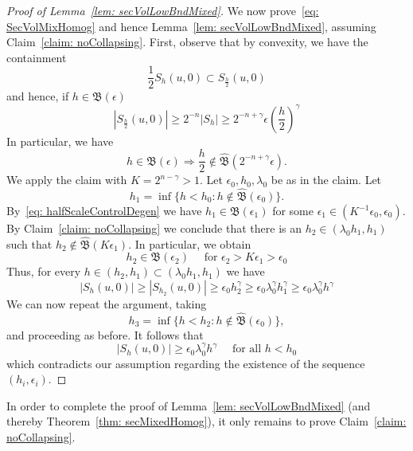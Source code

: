 \documentclass[12pt,reqno]{amsart}
\numberwithin{equation}{section}
\begin{document}
\begin{proof}[Proof of Lemma~\ref{lem: secVolLowBndMixed}]
We now prove~\eqref{eq: SecVolMixHomog} and hence Lemma~\ref{lem: secVolLowBndMixed}, assuming Claim~\ref{claim: noCollapsing}.  First, observe that by convexity, we have the containment
\[
\frac{1}{2}S_{h}(u,0) \subset S_{\frac{h}{2}}(u,0)
\]
and hence, if $h \in \mathfrak{B}(\epsilon)$
\[
|S_{\frac{h}{2}}(u,0)| \geq 2^{-n}|S_{h}| \geq 2^{-n+\gamma} \epsilon \left(\frac{h}{2}\right)^{\gamma}
\]
In particular, we have
\begin{equation}\label{eq: halfScaleControlDegen}
h \in \mathfrak{B}(\epsilon) \Rightarrow \frac{h}{2} \notin \widehat{\mathfrak{B}}(2^{-n+\gamma} \epsilon).
\end{equation}
We apply the claim with $K = 2^{n-\gamma}>1$.  Let $\epsilon_0, h_0, \lambda_0$ be as in the claim.  Let 
\[
h_1 = \inf \{ h< h_0 : h \notin \widehat{\mathfrak{B}} (\epsilon_0)\}.
\]
By~\eqref{eq: halfScaleControlDegen} we have $h_1 \in \mathfrak{B}(\epsilon_1)$ for some $\epsilon_1 \in (K^{-1} \epsilon_0, \epsilon_0)$.  By Claim~\ref{claim: noCollapsing} we conclude that there is an $h_2\in (\lambda_0h_1,h_1)$ such that $h_2 \notin \widehat{\mathfrak{B}}(K\epsilon_1)$.  In particular, we obtain
\[
h_2 \in \mathfrak{B}(\epsilon_2) \quad \text{ for } \epsilon_2 >K\epsilon_1 > \epsilon_0
\]
Thus, for every $h\in(h_2,h_1) \subset (\lambda_0h_1,h_1)$ we have
\[
|S_{h}(u,0)| \geq |S_{h_2}(u,0)| \geq \epsilon_0h_2^{\gamma} \geq \epsilon_0\lambda_0^{\gamma}h_1^{\gamma} \geq \epsilon_0\lambda_0^{\gamma}h^{\gamma}
\]
We can now repeat the argument, taking 
\[
h_3 = \inf \{ h< h_2 : h \notin \widehat{\mathfrak{B}} (\epsilon_0)\},
\]
and proceeding as before.  It follows that
\[
|S_{h}(u,0)| \geq \epsilon_0\lambda_0^{\gamma}h^{\gamma} \quad \text{ for all } h < h_0
\]
which contradicts our assumption regarding the existence of the sequence $(h_i, \epsilon_i)$.
\end{proof}

In order to complete the proof of Lemma~\ref{lem: secVolLowBndMixed} (and thereby Theorem~\ref{thm: secMixedHomog}), it only remains to prove Claim~\ref{claim: noCollapsing}.  
\end{document}
